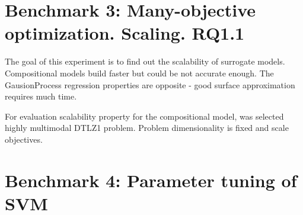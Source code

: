 



\section{Benchmark 3: Many-objective optimization. Scaling. RQ1.1}

    The goal of this experiment is to find out the scalability of surrogate models. Compositional models build faster but could be not accurate enough. The GausionProcess regression properties are opposite - good surface approximation requires much time. 

    For evaluation scalability property for the compositional model, was selected highly multimodal DTLZ1 problem. Problem dimensionality is fixed and scale objectives.










\section{Benchmark 4: Parameter tuning of SVM}



